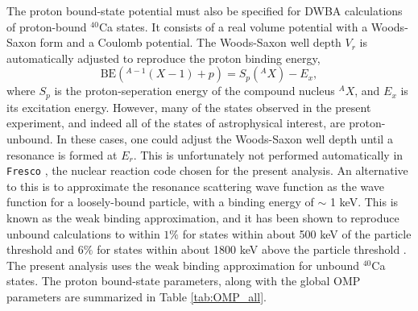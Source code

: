 The proton bound-state potential must also be specified for DWBA calculations of proton-bound $^{40}$Ca states. It consists of a real volume potential with a Woods-Saxon form and a Coulomb potential. The Woods-Saxon well depth $V_{r}$ is automatically adjusted to reproduce the proton binding energy,
\begin{equation}
\mathrm{BE}\left(^{A-1}(X-1) + p \right) = S_{p}(^{A}X) - E_{x},
\end{equation}
where $S_{p}$ is the proton-seperation energy of the compound nucleus $^{A}X$, and $E_{x}$ is its excitation energy. However, many of the states observed in the present experiment, and indeed all of the states of astrophysical interest, are proton-unbound. In these cases, one could adjust the Woods-Saxon well depth until a resonance is formed at $E_{r}$. This is unfortunately not performed automatically in \texttt{Fresco} \cite{Thompson1988,Fresco}, the nuclear reaction code chosen for the present analysis. An alternative to this is to approximate the resonance scattering wave function as the wave function for a loosely-bound particle, with a binding energy of $\sim$ 1 keV. This is known as the weak binding approximation, and it has been shown to reproduce unbound calculations to within $1\%$ for states within about 500 keV of the particle threshold and $6\%$ for states within about 1800 keV above the particle threshold \cite{Kankainen2016,Kahl2019}. The present analysis uses the weak binding approximation for unbound $^{40}$Ca states. The proton bound-state parameters, along with the global OMP parameters are summarized in Table \ref{tab:OMP_all}.

\begin{table}[t]
\caption{\label{tab:OMP_all}Global optical model potential parameters for $^{39}\mathrm{K} + \,^{3}\mathrm{He}$ and $^{40}\mathrm{Ca} + d$ and the proton bound-state parameters.}
\end{table}

